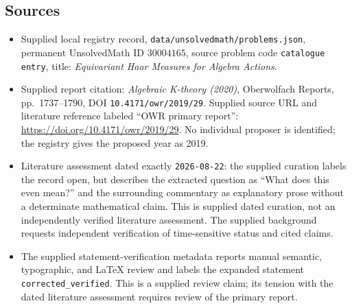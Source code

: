 \documentclass[11pt]{article}
\begin{document}
\subsection{Sources}
\begin{itemize}
\item Supplied local registry record, \texttt{data/unsolvedmath/problems.json}, permanent UnsolvedMath ID \(30004165\), source problem code \texttt{catalogue entry}, title: \emph{Equivariant Haar Measures for Algebra Actions}.
\item Supplied report citation: \emph{Algebraic K-theory (2020)}, Oberwolfach Reports, pp.\ 1737--1790, DOI \texttt{10.4171/owr/2019/29}. Supplied source URL and literature reference labeled ``OWR primary report'': \url{https://doi.org/10.4171/owr/2019/29}. No individual proposer is identified; the registry gives the proposed year as 2019.
\item Literature assessment dated exactly \texttt{2026-08-22}: the supplied curation labels the record open, but describes the extracted question as ``What does this even mean?'' and the surrounding commentary as explanatory prose without a determinate mathematical claim. This is supplied dated curation, not an independently verified literature assessment. The supplied background requests independent verification of time-sensitive status and cited claims.
\item The supplied statement-verification metadata reports manual semantic, typographic, and LaTeX review and labels the expanded statement \texttt{corrected\_verified}. This is a supplied review claim; its tension with the dated literature assessment requires review of the primary report.
\end{itemize}
\end{document}
